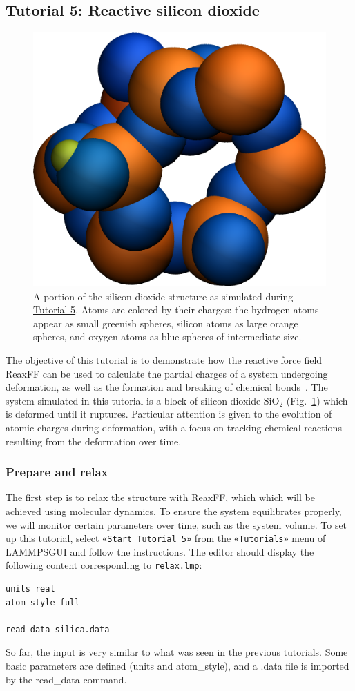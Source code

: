 \documentclass[9pt,tutorial]{livecoms}
\newcommand{\lmpcmd}[1]{\hspace{0pt}\colorbox{listing}{\textcolor{command}{\small{#1}}}\hspace{0pt}} %
\newcommand{\flecmd}[1]{\textcolor{command}{\texttt{#1}}} %
\newcommand{\guicmd}[1]{\textcolor{command}{\texttt{«#1»}}} %
\newcommand{\lammpsgui}{\textsf{LAMMPS\textendash GUI}}
\begin{document}
\subsection{Tutorial 5: Reactive silicon dioxide}
\label{reactive-silicon-dioxide-label}

\begin{figure}
\centering
\includegraphics[width=0.55\linewidth]{SIO}
\caption{A portion of the silicon dioxide structure as simulated during
\hyperref[reactive-silicon-dioxide-label]{Tutorial 5}.  Atoms are colored
by their charges: the hydrogen atoms appear as small greenish spheres, silicon
atoms as large orange spheres, and oxygen atoms as blue spheres of intermediate
size.}
\label{fig:SIO}
\end{figure}

The objective of this tutorial is to demonstrate how the reactive force field ReaxFF
can be used to calculate the partial charges of a system undergoing deformation, as well as
the formation and breaking of chemical bonds~\cite{van2001reaxff, zou2012investigation}.
The system simulated in this tutorial is a block of silicon dioxide $\text{SiO}_2$ (Fig.~\ref{fig:SIO})
which is deformed until it ruptures.  Particular attention is given to the evolution
of atomic charges during deformation, with a focus on tracking chemical reactions
resulting from the deformation over time.

\subsubsection{Prepare and relax}

The first step is to relax the structure with ReaxFF, which which will be achieved using
molecular dynamics.  To ensure the system equilibrates properly, we will monitor certain
parameters over time, such as the system volume.  To set up this
tutorial, select \guicmd{Start Tutorial 5} from the
\guicmd{Tutorials} menu of \lammpsgui{} and follow the instructions.
The editor should display the following content corresponding to \flecmd{relax.lmp}:
\begin{lstlisting}
units real
atom_style full

read_data silica.data

\end{lstlisting}
So far, the input is very similar to what was seen in the previous tutorials.
Some basic parameters are defined (\lmpcmd{units} and \lmpcmd{atom\_style}),
and a \lmpcmd{.data} file is imported by the \lmpcmd{read\_data} command.
\end{document}
